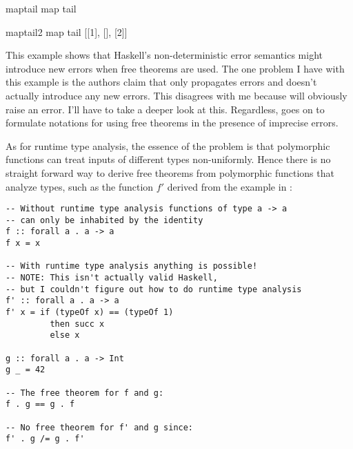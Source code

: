 \begin{SaveVerbatim}{maptail}
map tail
\end{SaveVerbatim}
\begin{SaveVerbatim}{maptail2}
map tail [[1], [], [2]]
\end{SaveVerbatim}

This example shows that Haskell's non-deterministic error semantics might introduce new errors when free theorems are used. The one problem I have with this example is the authors claim that  only propagates errors and doesn't actually introduce any new errors. This disagrees with me because  will obviously raise an error. I'll have to take a deeper look at this. Regardless, \cite{impreciseSemantics} goes on to formulate notations for using free theorems in the presence of imprecise errors.

As for runtime type analysis, the essence of the problem is that polymorphic functions can treat inputs of different types non-uniformly. Hence there is no straight forward way to derive free theorems from polymorphic functions that analyze types, such as the function $f'$ derived from the example in \cite{vytinFree}:

\begin{verbatim}
-- Without runtime type analysis functions of type a -> a
-- can only be inhabited by the identity
f :: forall a . a -> a
f x = x

-- With runtime type analysis anything is possible!
-- NOTE: This isn't actually valid Haskell,
-- but I couldn't figure out how to do runtime type analysis
f' :: forall a . a -> a
f' x = if (typeOf x) == (typeOf 1)
         then succ x
         else x

g :: forall a . a -> Int
g _ = 42

-- The free theorem for f and g:
f . g == g . f

-- No free theorem for f' and g since:
f' . g /= g . f'
\end{verbatim}

